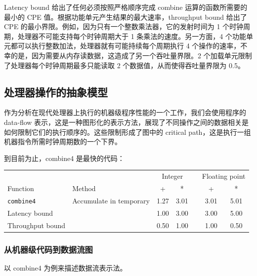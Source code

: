 Latency bound 给出了任何必须按照严格顺序完成 combine 运算的函数所需要的最小的 CPE 值。根据功能单元产生结果的最大速率，throughput bound 给出了 CPE 的最小界限。例如，因为只有一个整数乘法器，它的发射时间为 1 个时钟周期，处理器不可能支持每个时钟周期大于 1 条乘法的速度。另一方面，4 个功能单元都可以执行整数加法，处理器就有可能持续每个周期执行 4 个操作的速率，不幸的是，因为需要从内存读数据，这造成了另一个吞吐量界限。2 个加载单元限制了处理器每个时钟周期最多只能读取 2 个数据值，从而使得吞吐量界限为 0.5。

\subsection{处理器操作的抽象模型}

作为分析在现代处理器上执行的机器级程序性能的一个工作，我们会使用程序的 data-flow 表示，这是一种图形化的表示方法，展现了不同操作之间的数据相关是如何限制它们的执行顺序的。这些限制形成了图中的 critical path，这是执行一组机器指令所需时钟周期数的一个下界。

到目前为止，combine4 是最快的代码：

\begin{table}[!ht]
    \centering
    \begin{tabular}{llccccc}
        \toprule
        & & \multicolumn{2}{c}{Integer} & & \multicolumn{2}{c}{Floating point} \\
        \cmidrule{3-4} \cmidrule{6-7}
        Function & Method & + & * & & + & * \\
        \midrule
        \texttt{combine4} & Accumulate in temporary & 1.27 & 3.01 & & 3.01 & 5.01 \\
        Latency bound & & 1.00 & 3.00 & & 3.00 & 5.00 \\
        Throughput bound & & 0.50 & 1.00 & & 1.00 & 0.50 \\
        \bottomrule
    \end{tabular}
\end{table}

\subsubsection{从机器级代码到数据流图}

以 combine4 为例来描述数据流表示法。


